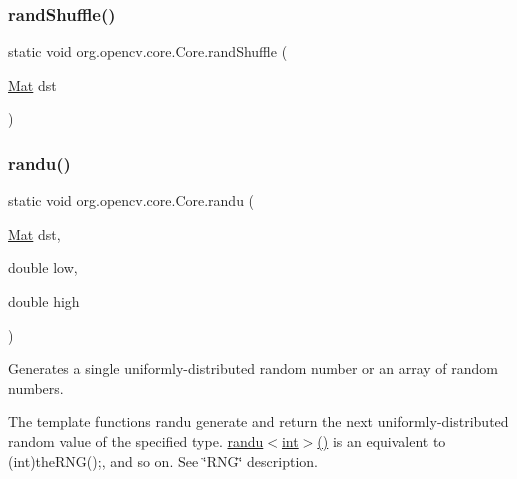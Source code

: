\mbox{\label{classorg_1_1opencv_1_1core_1_1_core_ac1698bb3fd0c489839e5dd5eccfe5260}} 
\subsubsection{\texorpdfstring{rand\+Shuffle()}{randShuffle()}\hspace{0.1cm}{\footnotesize\ttfamily [2/2]}}
{\footnotesize\ttfamily static void org.\+opencv.\+core.\+Core.\+rand\+Shuffle (\begin{DoxyParamCaption}\item[{\mbox{\hyperlink{classorg_1_1opencv_1_1core_1_1_mat}{Mat}}}]{dst }\end{DoxyParamCaption})\hspace{0.3cm}{\ttfamily [static]}}

\mbox{\label{classorg_1_1opencv_1_1core_1_1_core_abfe7d53276a89fcf1a78b744cd75b9fc}} 
\subsubsection{\texorpdfstring{randu()}{randu()}}
{\footnotesize\ttfamily static void org.\+opencv.\+core.\+Core.\+randu (\begin{DoxyParamCaption}\item[{\mbox{\hyperlink{classorg_1_1opencv_1_1core_1_1_mat}{Mat}}}]{dst,  }\item[{double}]{low,  }\item[{double}]{high }\end{DoxyParamCaption})\hspace{0.3cm}{\ttfamily [static]}}

Generates a single uniformly-\/distributed random number or an array of random numbers.

The template functions {\ttfamily randu} generate and return the next uniformly-\/distributed random value of the specified type. {\ttfamily \mbox{\hyperlink{classorg_1_1opencv_1_1core_1_1_core_abfe7d53276a89fcf1a78b744cd75b9fc}{randu$<$int$>$()}}} is an equivalent to {\ttfamily (int)the\+R\+N\+G();}, and so on. See \char`\"{}\+R\+N\+G\char`\"{} description.

